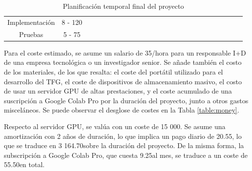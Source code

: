 \begin{table}[h]
{\begin{tabular}{|c|c|ll|llll|llll|lllll|llll|llll|}
Implementación & 8 - 120 &  &  &  &  &  &  &  &  &  & \cellcolor[HTML]{9B9B9B} & \cellcolor[HTML]{9B9B9B} & \cellcolor[HTML]{9B9B9B} & \cellcolor[HTML]{9B9B9B} &  &  &  & \cellcolor[HTML]{9B9B9B} & \cellcolor[HTML]{9B9B9B} & \cellcolor[HTML]{9B9B9B} & \cellcolor[HTML]{9B9B9B} &  &  &  \\ \cline{1-1}
Pruebas & 5 - 75 &  &  &  &  &  &  &  &  &  &  &  &  &  & \cellcolor[HTML]{9B9B9B} & \cellcolor[HTML]{9B9B9B} & \cellcolor[HTML]{9B9B9B} &  &  &  &  & \cellcolor[HTML]{9B9B9B} & \cellcolor[HTML]{9B9B9B} &  \\ \hline
\end{tabular}%
}
\caption{Planificación temporal final del proyecto}
\label{table:plan2}
\end{table}

Para el coste estimado, se asume un salario de 35\officialeuro/hora para un responsable I+D de una empresa tecnológica o un investigador senior. Se añade también el costo de los materiales, de los que resalta: el coste del portátil utilizado para el desarrollo del TFG, el coste de dispositivos de almacenamiento masivo, el costo de usar un servidor GPU de altas prestaciones, y el coste acumulado de una suscripción a Google Colab Pro por la duración del proyecto, junto a otros gastos misceláneos. Se puede observar el desglose de costes en la Tabla \ref{table:money}.

Respecto al servidor GPU, se valúa con un coste de 15 000\officialeuro. Se asume una amortización con 2 años de duración, lo que implica un pago diario de 20.55\officialeuro, lo que se traduce en 3 164.70\officialeuro\space sobre la duración del proyecto. De la misma forma, la subscripción a Google Colab Pro, que cuesta 9.25\officialeuro\space al mes, se traduce a un coste de 55.50\officialeuro\space en total.

